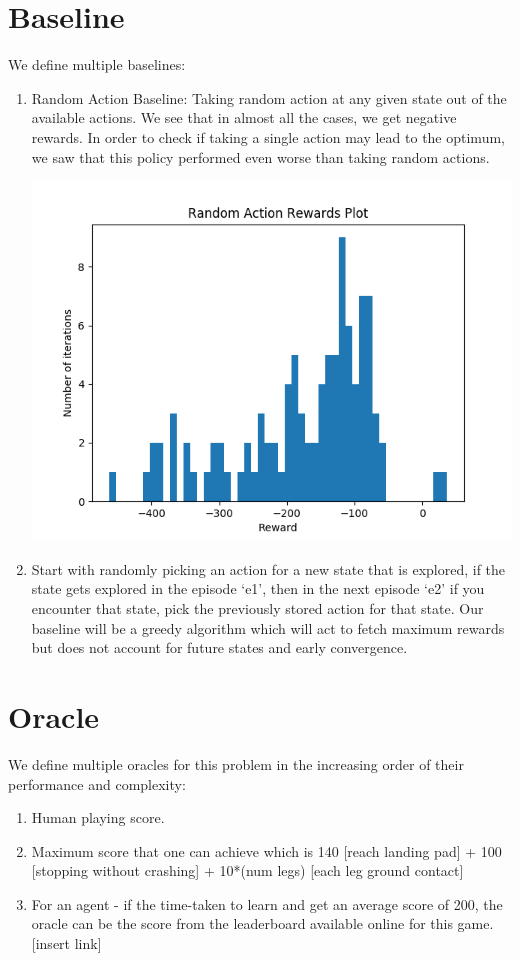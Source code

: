 \documentclass[12pt]{article}
\begin{document}
\section{Baseline}
We define multiple baselines:
\begin{enumerate}[label=(\alph*)]
\item Random Action Baseline: Taking random action at any given state out of the available actions. We see that in almost all the cases, we get negative rewards. In order to check if taking a single action may lead to the optimum, we saw that this policy performed even worse than taking random actions.
\newline
\begin{center}
\includegraphics[scale=0.3]{images/random-action-reward-plot.png}
\end{center}
\item Start with randomly picking an action for a new state that is explored, if the state gets explored in the episode ‘e1’, then in the next episode ‘e2’ if you encounter that state, pick the previously stored action for that state. Our baseline will be a greedy algorithm which will act to  fetch maximum rewards but does not account for future states and early convergence.
\end{enumerate}


\section{Oracle}
We define multiple oracles for this problem in the increasing order of their performance and complexity:
\begin{enumerate}[label=(\alph*)]
\item Human playing score.
\item Maximum score that one can achieve which is 140 [reach landing pad]  + 100 [stopping without crashing] + 10*(num legs) [each leg ground contact]
\item For an agent - if the time-taken to learn and get an average score of 200, the oracle can be the score from the leaderboard available online for this game. [insert link]
\end{enumerate}
\end{document}

